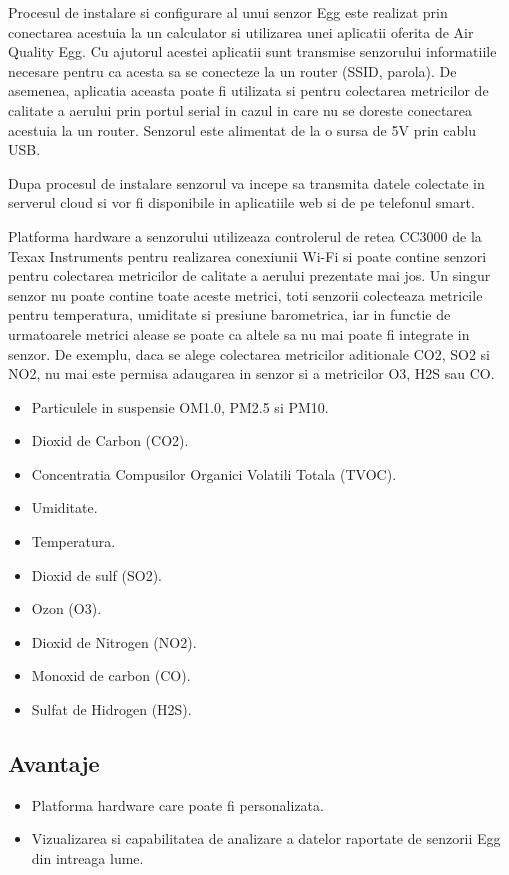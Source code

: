 Procesul de instalare si configurare al unui senzor Egg este realizat prin conectarea acestuia la un calculator si utilizarea unei aplicatii oferita de Air 
Quality Egg. Cu ajutorul acestei aplicatii sunt transmise senzorului informatiile necesare pentru ca acesta sa se conecteze la un router (SSID, parola). De 
asemenea, aplicatia aceasta poate fi utilizata si pentru colectarea metricilor de calitate a aerului prin portul serial in cazul in care nu se doreste conectarea 
acestuia la un router. Senzorul este alimentat de la o sursa de 5V prin cablu USB.

Dupa procesul de instalare senzorul va incepe sa transmita datele colectate in serverul cloud si vor fi disponibile in aplicatiile web si de pe telefonul smart.

Platforma hardware a senzorului utilizeaza controlerul de retea CC3000 de la Texax Instruments pentru realizarea conexiunii Wi-Fi si poate contine senzori pentru 
colectarea metricilor de calitate a aerului prezentate mai jos. Un singur senzor nu poate contine toate aceste metrici, toti senzorii colecteaza metricile pentru 
temperatura, umiditate si presiune barometrica, iar in functie de urmatoarele metrici alease se poate ca altele sa nu mai poate fi integrate in senzor. De exemplu, 
daca se alege colectarea metricilor aditionale CO2, SO2 si NO2, nu mai este permisa adaugarea in senzor si a metricilor O3, H2S sau CO.
\begin{itemize}
	\item Particulele in suspensie OM1.0, PM2.5 si PM10.
	\item Dioxid de Carbon (CO2).
	\item Concentratia Compusilor Organici Volatili Totala (TVOC).
	\item Umiditate.
	\item Temperatura.
	\item Dioxid de sulf (SO2). 
	\item Ozon (O3).
	\item Dioxid de Nitrogen (NO2).
	\item Monoxid de carbon (CO).
	\item Sulfat de Hidrogen (H2S).
\end{itemize}

\subsection{Avantaje}\label{subsec:airqualityegg_avantaje}
\begin{itemize}
	\item Platforma hardware care poate fi personalizata.
	\item Vizualizarea si capabilitatea de analizare a datelor raportate de senzorii Egg din intreaga lume.
\end{itemize}
